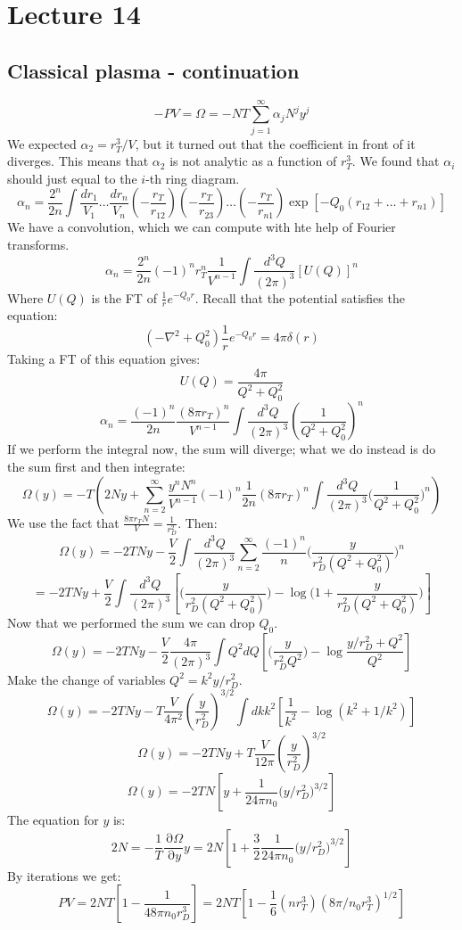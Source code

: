 \documentclass[12 pt]{article}
\DeclareMathOperator {\p} {\partial}
\begin{document}
\section*{Lecture 14}
\subsection*{Classical plasma - continuation}
\[    - PV = \Omega = - NT \sum_{j=1}^{\infty} \alpha_j N^j y^j    \]
We expected $\alpha_2 = r_T^3/V$, but it turned out that the coefficient in front of it diverges. This means that $\alpha_2$ is not analytic as a function of $r_T^3$. We found that $\alpha_i$ should just equal to the $i$-th ring diagram.
\[     \alpha_n = \frac{2^n}{2n} \int \frac{dr_1}{V_1} \dots \frac{dr_n}{V_n} \left( - \frac{r_T}{r_{12}} \right)\left( - \frac{r_T}{r_{23}} \right) \dots \left( - \frac{r_T}{r_{n1}} \right)  \exp[-Q_0(r_{12}+ \dots + r_{n1})]  \]
We have a convolution, which we can compute with hte help of Fourier transforms.
\[   \alpha_n = \frac{2^n}{2n} (-1)^n r_T^n \frac{1}{V^{n-1}}  \int \frac{d^3 Q}{(2\pi)^3} [U(Q)]^n \]
Where $U(Q)$ is the FT of $\frac{1}{r} e^{-Q_0 r}$. Recall that the potential satisfies the equation:
\[     \left(  - \nabla^2 + Q_0^2  \right) \frac{1}{r} e^{-Q_0 r} = 4\pi \delta(r)       \]
Taking a FT of this equation gives:
\[  U(Q) = \frac{4\pi}{Q^2 + Q_0^2}    \]
\[       \alpha_n = \frac{(-1)^n}{2n} \frac{(8\pi r_T)^n}{V^{n-1}} \int \frac{d^3 Q}{(2\pi)^3} \left( \frac{1}{Q^2 + Q_0^2}  \right)^n       \]
If we perform the integral now, the sum will diverge; what we do instead is do the sum first and then integrate:
\[      \Omega(y) = -T \left( 2N y + \sum_{n=2}^{\infty} \frac{y^n N^n}{V^{n-1}} (-1)^n \frac{1}{2n} (8\pi r_T)^n      \int \frac{d^3 Q}{(2\pi)^3} \big( \frac{1}{Q^2 + Q_0^2}  \big)^n \right)  \]
We use the fact that $\frac{8\pi r_T N}{V} = \frac{1}{r_D^2}$. Then:
\[      \Omega(y) = - 2TNy - \frac{V}{2} \int \frac{d^3Q}{(2\pi)^3} \sum_{n=2}^{\infty} \frac{(-1)^n}{n} \big( \frac{ y}{r_D^2 (Q^2 + Q_0^2)}   \big)^n  \]
\[   = - 2TNy  + \frac{V}{2}  \int \frac{d^3Q}{(2\pi)^3}  \left[   \big( \frac{y}{r_D^2 (Q^2 + Q_0^2)}  \big) - \log \big( 1 + \frac{y}{r_D^2 (Q^2 + Q_0^2)}  \big)  \right]       \]
Now that we performed the sum we can drop $Q_0$.
\[      \Omega(y) = - 2TNy - \frac{V}{2} \frac{4\pi}{(2\pi)^3} \int Q^2 dQ   \left[   \big( \frac{y}{r_D^2 Q^2 }  \big) - \log  \frac{y/r_D^2 + Q^2}{Q^2}   \right]         \]
Make the change of variables $Q^2 = k^2 y/ r_D^2$.
\[      \Omega(y) =     - 2TNy - T\frac{V}{4\pi^2} \left( \frac{y}{r_D^2} \right)^{3/2}  \int dk k^2 \left[ \frac{1}{k^2} - \log(k^2 + 1/k^2)  \right]  \]
\[    \Omega(y) = - 2TNy + T \frac{V}{12\pi}  \left( \frac{y}{r_D^2}  \right)^{3/2}    \]
\[      \Omega(y) = -2TN \left[ y + \frac{1}{24 \pi n_0} \big( y/r_D^2  \big)^{3/2}  \right]     \]
The equation for $y$ is:
\[      2N = - \frac{1}{T} \frac{\p \Omega}{\p y} y = 2N \left[ 1+ \frac{3}{2} \frac{1}{24\pi n_0} \big( y/r_D^2 \big)^{3/2}  \right]     \]
By iterations we get:
\[     PV = 2NT \left[ 1 - \frac{1}{48\pi n_0 r_D^3}  \right]  = 2NT \left[  1 - \frac{1}{6} (nr_T^3) (8\pi/n_0r_T^3)^{1/2}  \right]     \]
\end{document}
